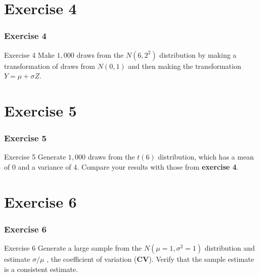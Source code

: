 \documentclass[11pt, aspectratio=169]{beamer}
\begin{document}
	\section{Exercise 4}
		\begin{frame}
			\frametitle{Exercise 4}
			\begin{block}{Exercise 4}
				Make $1,000$ draws from the $N(6,2^{2})$ distribution by making a
				transformation of draws from $N(0,1)$ and then making the
				transformation $Y = \mu + \sigma Z$.
			\end{block}
		\end{frame}
	\section{Exercise 5}
		\begin{frame}
			\frametitle{Exercise 5}
			\begin{block}{Exercise 5}
				Generate $1,000$ draws from the $t(6)$ distribution, which has a mean of
				$0$ and a variance of $4$. Compare your results with those from
				\textbf{exercise 4}.
			\end{block}
		\end{frame}
	\section{Exercise 6}
		\begin{frame}
			\frametitle{Exercise 6}
			\begin{block}{Exercise 6}
				Generate a large sample from the $N(\mu = 1, \sigma^{2} = 1)$ distribution and
				estimate $\sigma/\mu$ , the coefficient of variation (\textbf{CV}). Verify that the sample
				estimate is a consistent estimate.
			\end{block}
		\end{frame}
\end{document}

